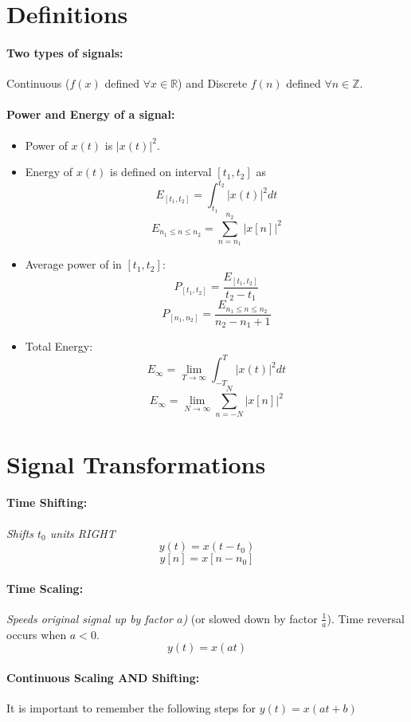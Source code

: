 \documentclass[a4paper,12pt]{report}
\def\reals{\mathbb{R}}
\def\integers{\mathbb{Z}}
\begin{document}
\section{Definitions}

\paragraph{Two types of signals: } Continuous ($f(x)$ defined $\forall x \in \reals$) and Discrete $f(n)$ defined $\forall n \in \integers$.

\paragraph{Power and Energy of a signal: }
\begin{itemize}
	\item Power of $x(t)$ is $|x(t)|^2$.
	\item Energy of $x(t)$ is defined on interval $[t_1, t_2]$ as 
	$$E_{[t_1, t_2]} = \int_{t_1}^{t_2} |x(t)|^2 dt$$
	$$E_{n_1 \leq n \leq n_2} = \sum_{n=n_1}^{n_2} |x[n]|^2$$

	\item Average power of in $[t_1, t_2]$:
	$$P_{[t_1, t_2]} = \frac{E_{[t_1, t_2]}}{t_2 - t_1}$$
	$$P_{[n_1, n_2]} = \frac{E_{n_1 \leq n \leq n_2}}{n_2 - n_1 + 1}$$
	\item Total Energy: 
	$$E_{\infty} = \lim_{T\to\infty} \int_{-T}^T |x(t)|^2 dt$$
	$$E_{\infty} = \lim_{N\to\infty} \sum_{n = -N}^{N} |x[n]|^2$$
\end{itemize}


\section{Signal Transformations}

\paragraph{Time Shifting: } \textit{Shifts $t_0$ units RIGHT}
$$y(t) = x(t-t_0)$$
$$y[n] = x[n-n_0]$$

\paragraph{Time Scaling: } \textit{Speeds original signal up by factor $a$)} (or slowed down by factor $\frac{1}{a}$). Time reversal occurs when $a<0$.
$$y(t) = x(at)$$

\paragraph{Continuous Scaling AND Shifting: } It is important to remember the following steps for $y(t) = x(at+b)$
\end{document}
